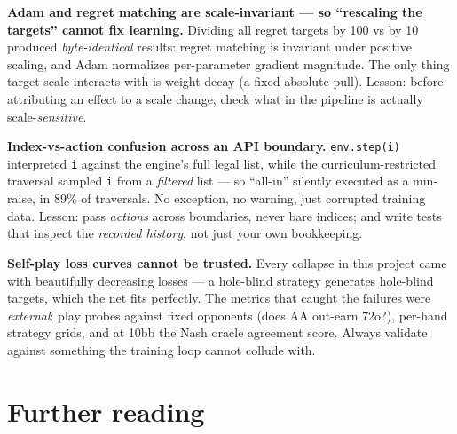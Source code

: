 \documentclass[11pt,a4paper]{article}
\begin{document}
\begin{trap}
\textbf{Adam and regret matching are scale-invariant --- so ``rescaling the
targets'' cannot fix learning.}
Dividing all regret targets by 100 vs by 10 produced \emph{byte-identical}
results: regret matching is invariant under positive scaling, and Adam
normalizes per-parameter gradient magnitude. The only thing target scale
interacts with is weight decay (a fixed absolute pull). Lesson: before
attributing an effect to a scale change, check what in the pipeline is
actually scale-\emph{sensitive}.
\end{trap}

\begin{trap}
\textbf{Index-vs-action confusion across an API boundary.}
\texttt{env.step(i)} interpreted \texttt{i} against the engine's full legal
list, while the curriculum-restricted traversal sampled \texttt{i} from a
\emph{filtered} list --- so ``all-in'' silently executed as a min-raise, in
89\% of traversals. No exception, no warning, just corrupted training data.
Lesson: pass \emph{actions} across boundaries, never bare indices; and write
tests that inspect the \emph{recorded history}, not just your own bookkeeping.
\end{trap}

\begin{trap}
\textbf{Self-play loss curves cannot be trusted.}
Every collapse in this project came with beautifully decreasing losses ---
a hole-blind strategy generates hole-blind targets, which the net fits
perfectly. The metrics that caught the failures were \emph{external}:
play probes against fixed opponents (does AA out-earn 72o?), per-hand strategy
grids, and at 10bb the Nash oracle agreement score. Always validate against
something the training loop cannot collude with.
\end{trap}

\section{Further reading}
\end{document}
